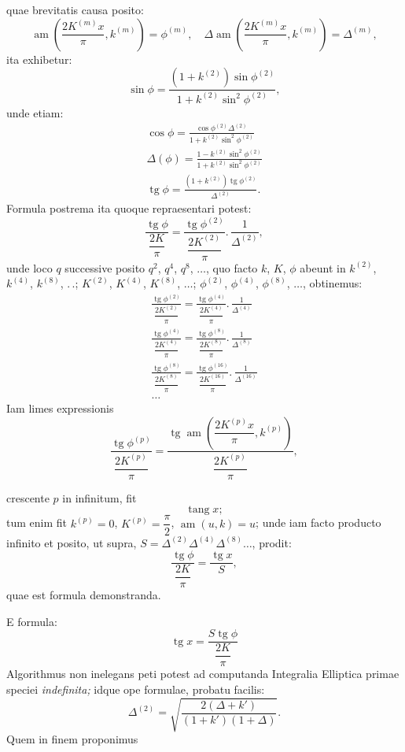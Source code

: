 \documentclass{article}
\begin{document}
quae brevitatis causa posito:
\[
\operatorname{am}\left(\frac{2K^{(m)}x}{\pi},k^{(m)}\right)=\phi^{(m)},\quad\Delta\operatorname{am}\left(\frac{2K^{(m)}x}{\pi},k^{(m)}\right)=\Delta^{(m)},
\]
ita exhibetur:
\[
\sin\phi=\frac{(1+k^{(2)})\sin\phi^{(2)}}{1+k^{(2)}\sin^{2}\phi^{(2)}},
\]
unde etiam:
\[
\begin{gathered}
\cos\phi=\frac{\cos\phi^{(2)}\Delta^{(2)}}{1+k^{(2)}\sin^{2}\phi^{(2)}}
\\[2ex]
\Delta(\phi)=\frac{1-k^{(2)}\sin^{2}\phi^{(2)}}{1+k^{(2)}\sin^{2}\phi^{(2)}}
\\[2ex]
\operatorname{tg}\phi=\frac{(1+k^{(2)})\operatorname{tg}\phi^{(2)}}{\Delta^{(2)}}.
\end{gathered}
\]
Formula postrema ita quoque repraesentari potest:
\[
\frac{\operatorname{tg}\phi}{\dfrac{2K}{\pi}}=\frac{\operatorname{tg}\phi^{(2)}}{\dfrac{2K^{(2)}}{\pi}}.\,\frac{1}{\Delta^{(2)}},
\]
unde loco $q$ successive posito $q^{2}$, $q^{4}$, $q^{8}$, $\ldots$, quo facto $k$, $K$, $\phi$ abeunt in $k^{(2)}$, $k^{(4)}$, $k^{(8)}$, $.\,.$; $K^{(2)}$, $K^{(4)}$, $K^{(8)}$, $\ldots$; $\phi^{(2)}$, $\phi^{(4)}$, $\phi^{(8)}$, $\ldots$, obtinemus:
\[
\begin{gathered}
\frac{\operatorname{tg}\phi^{(2)}}{\dfrac{2K^{(2)}}{\pi}}=\frac{\operatorname{tg}\phi^{(4)}}{\dfrac{2K^{(4)}}{\pi}}.\,\frac{1}{\Delta^{(4)}}
\\[2ex]
\frac{\operatorname{tg}\phi^{(4)}}{\dfrac{2K^{(4)}}{\pi}}=\frac{\operatorname{tg}\phi^{(8)}}{\dfrac{2K^{(8)}}{\pi}}.\,\frac{1}{\Delta^{(8)}}
\\[2ex]
\frac{\operatorname{tg}\phi^{(8)}}{\dfrac{2K^{(8)}}{\pi}}=\frac{\operatorname{tg}\phi^{(16)}}{\dfrac{2K^{(16)}}{\pi}}.\,\frac{1}{\Delta^{(16)}}
\\[2ex]
\ldots
\end{gathered}
\]
Iam limes expressionis
\[
\frac{\operatorname{tg}\phi^{(p)}}{\dfrac{2K^{(p)}}{\pi}}=\frac{\operatorname{tg}\operatorname{am}\left(\dfrac{2K^{(p)}x}{\pi},k^{(p)}\right)}{\dfrac{2K^{(p)}}{\pi}},
\]

crescente $p$ in infinitum, fit
\[
\operatorname{tang}x;
\]
tum enim fit $k^{(p)}=0$, $K^{(p)}=\dfrac{\pi}{2}$, $\operatorname{am}(u,k)=u$; unde iam facto producto infinito et posito, ut supra, $S=\Delta^{(2)}\Delta^{(4)}\Delta^{(8)}\ldots$, prodit:
\[
\frac{\operatorname{tg}\phi}{\dfrac{2K}{\pi}}=\frac{\operatorname{tg}x}{S},
\]
quae est formula demonstranda.

E formula:
\[
\operatorname{tg}x=\frac{S\operatorname{tg}\phi}{\dfrac{2K}{\pi}}
\]
Algorithmus non inelegans peti potest ad computanda Integralia Elliptica primae speciei \emph{indefinita;} idque ope formulae, probatu facilis:
\[
\Delta^{(2)}=\sqrt{\frac{2(\Delta+k')}{(1+k')(1+\Delta)}}.
\]
Quem in finem proponimus
\end{document}
